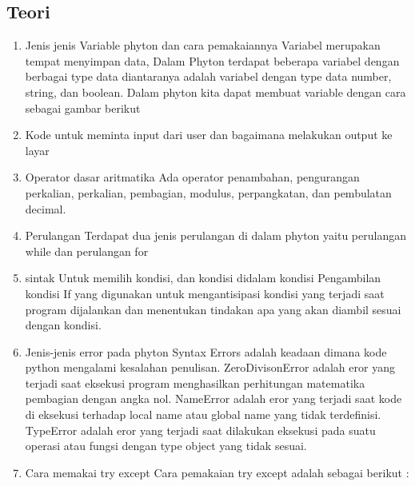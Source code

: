 \subsection{Teori}
\begin{enumerate}
    \item Jenis jenis Variable phyton dan cara pemakaiannya 
	Variabel merupakan tempat menyimpan data, Dalam Phyton terdapat beberapa variabel dengan berbagai type data diantaranya adalah variabel dengan type data number, string, dan boolean. 
	Dalam phyton kita dapat membuat variable dengan cara sebagai gambar berikut
    
    \item Kode untuk meminta input dari user dan bagaimana melakukan output ke layar
	
    \item Operator dasar aritmatika
	Ada operator penambahan, pengurangan perkalian, perkalian, pembagian, modulus, perpangkatan, dan pembulatan decimal.
	
    \item Perulangan
	Terdapat dua jenis perulangan di dalam phyton yaitu perulangan while dan perulangan for
	
	
    \item sintak Untuk memilih kondisi, dan kondisi didalam kondisi
	Pengambilan kondisi If yang digunakan untuk mengantisipasi kondisi yang terjadi saat program dijalankan dan menentukan tindakan apa yang akan diambil sesuai dengan kondisi.
	
	
	

    \item Jenis-jenis error pada phyton
Syntax Errors adalah keadaan dimana kode python mengalami kesalahan penulisan. 
ZeroDivisonError adalah eror yang terjadi saat eksekusi program menghasilkan perhitungan matematika pembagian dengan angka nol.
NameError adalah eror yang terjadi saat kode di eksekusi terhadap local name atau global name yang tidak terdefinisi. 
TypeError adalah eror yang terjadi saat dilakukan eksekusi pada suatu operasi atau fungsi dengan type object yang tidak sesuai.

    \item Cara memakai try except
Cara pemakaian try except adalah sebagai berikut :
	

\end{enumerate}

